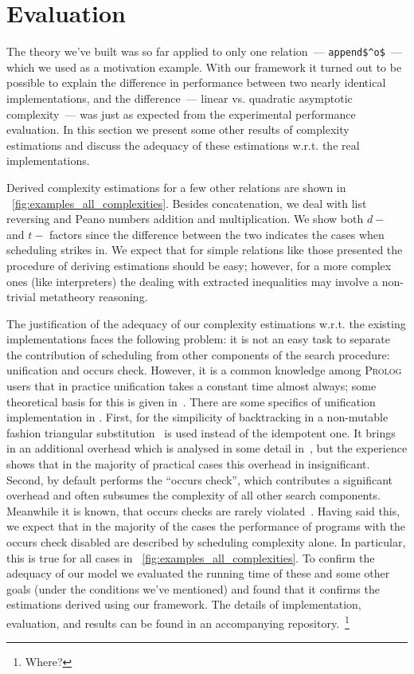 \section{Evaluation}
\label{sec:evaluation}

The theory we've built was so far applied to only one relation~--- \lstinline|append$^o$|~--- which we used as a motivation example. With our framework it turned out
to be possible to explain the difference in performance between two nearly identical implementations, and the difference~--- linear vs. quadratic asymptotic
complexity~--- was just as expected from the experimental performance evaluation. In this section we present some other results of complexity estimations and
discuss the adequacy of these estimations w.r.t. the real \mK implementations.

Derived complexity estimations for a few other relations are shown in \figureword~\ref{fig:examples_all_complexities}. Besides concatenation, we deal with
list reversing and Peano numbers addition and multiplication. We show both $d-$ and $t-$ factors since the difference between the two indicates the
cases when scheduling strikes in. We expect that for simple relations like those presented the procedure of deriving estimations should be easy; however,
for a more complex ones (like interpreters) the dealing with extracted inequalities may involve a non-trivial metatheory reasoning.

The justification of the adequacy of our complexity estimations w.r.t. the existing \mK implementations faces the following problem: it is
not an easy task to separate the contribution of scheduling from other components of the search procedure: unification and occurs check. However, it is a common
knowledge among \textsc{Prolog} users that in practice unification takes a constant time almost always; some theoretical basis for this is given in~\cite{UnificationAverageCost}.
There are some specifics of unification implementation in \mK. First, for the simpilicity of backtracking in a non-mutable fashion triangular
substitution~\cite{UnificationTheory} is used instead of the idempotent one. It brings in an additional overhead which is analysed
in some detail in~\cite{WillsTheisis}, but the experience shows that in the majority of practical cases this overhead in insignificant. Second, \mK by default
performs the ``occurs check'', which contributes a significant overhead and often subsumes the complexity of all other search components. Meanwhile it is known, that occurs checks are rarely
violated~\cite{OccursChecksRevisited}. Having said this, we expect that in the majority of the cases the performance of \mK programs with the occurs check disabled are
described by scheduling complexity alone. In particular, this is true for all cases in \figureword~\ref{fig:examples_all_complexities}. To confirm the adequacy of
our model we evaluated the running time of these and some other goals (under the conditions we've mentioned) and found that it confirms the estimations derived
using our framework. The details of implementation, evaluation, and results can be found in an accompanying repository.~\footnote{Where?}

